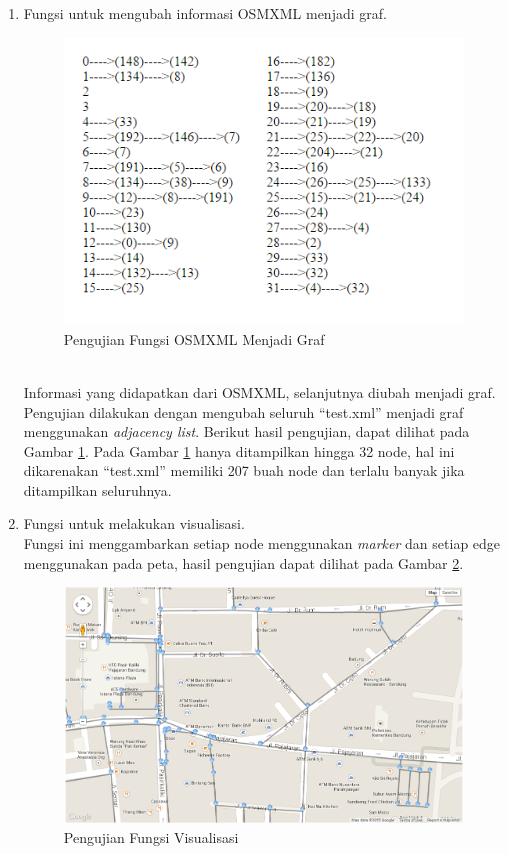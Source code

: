 \begin{enumerate}
\item Fungsi untuk mengubah informasi OSMXML menjadi graf.
\begin{figure}[h]
\centering
\includegraphics[scale=1]{Gambar/pu_graf}
\caption[Pengujian Fungsi OSMXML Menjadi Graf]{Pengujian Fungsi OSMXML Menjadi Graf}
\label{fig:pu_graf}
\end{figure}\\
  Informasi yang didapatkan dari OSMXML, selanjutnya diubah menjadi graf.
  Pengujian dilakukan dengan mengubah seluruh ``test.xml'' menjadi graf
  menggunakan \textit{adjacency list}. Berikut hasil pengujian, dapat dilihat
  pada Gambar \ref{fig:pu_graf}. Pada Gambar \ref{fig:pu_graf} hanya ditampilkan
  hingga 32 node, hal ini dikarenakan ``test.xml'' memiliki 207 buah node dan 
  terlalu banyak jika ditampilkan seluruhnya.
  
  \item Fungsi untuk melakukan visualisasi.\\
  Fungsi ini menggambarkan setiap node menggunakan \textit{marker} dan
  setiap edge menggunakan  pada peta, hasil pengujian dapat
  dilihat pada Gambar \ref{fig:pu_visual}.
\begin{figure}[h]
\centering
\includegraphics[scale=0.5]{Gambar/pu_visual}
\caption[Pengujian Fungsi Visualisasi]{Pengujian Fungsi Visualisasi}
\label{fig:pu_visual}
\end{figure}


\end{enumerate}
